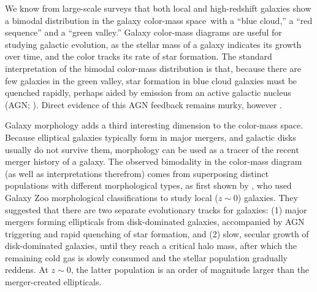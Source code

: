 \documentclass[twocolumn]{aastex63}
\begin{document}
We know from large-scale surveys that both local and high-redshift galaxies show a bimodal distribution in the galaxy color-mass space\,\citep{strateva_01,baldry_04,baldry_06,brammer_09} with a ``blue cloud,'' a ``red sequence'' and a ``green valley.'' Galaxy color-mass diagrams are useful for studying galactic evolution, as the stellar mass of a galaxy indicates its growth over time, and the color tracks its rate of star formation. The standard interpretation of the bimodal color-mass distribution is that, because there are few galaxies in the green valley, star formation in blue cloud galaxies must be quenched rapidly, perhaps aided by emission from an active galactic nucleus (AGN; \citealp{bell_04,faber_07}). Direct evidence of this AGN feedback remains murky, however \citep{harrison_17}.

Galaxy morphology adds a third interesting dimension to the color-mass space. Because elliptical galaxies typically form in major mergers, and galactic disks usually do not survive them, morphology can be used as a tracer of the recent merger history of a galaxy. The observed bimodality in the color-mass diagram (as well as interpretations therefrom) comes from superposing distinct populations with different morphological types, as first shown by \citet{schawinski_14_green_herring}, who used Galaxy Zoo morphological classifications to study local ($z\sim0$) galaxies. They suggested that there are two separate evolutionary tracks for galaxies: (1) major mergers forming ellipticals from disk-dominated galaxies, accompanied by AGN triggering and rapid quenching of star formation, and (2) slow, secular growth of disk-dominated galaxies, until they reach a critical halo mass, after which the remaining cold gas is slowly consumed and the stellar population gradually reddens. At $z\sim0$, the latter population is an order of magnitude larger than the merger-created ellipticals. 
\end{document}
